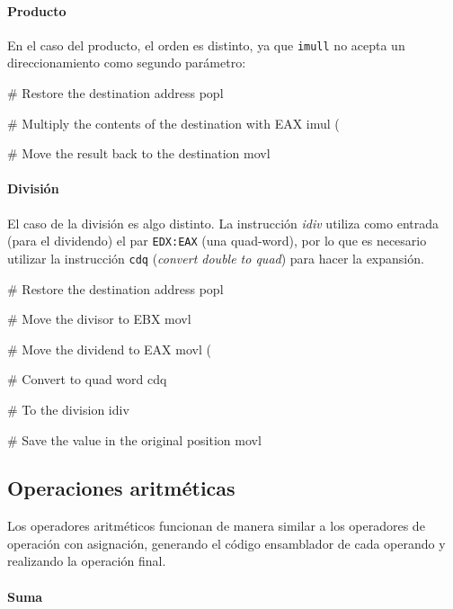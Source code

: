 \documentclass[11pt]{scrartcl}
\begin{document}
\paragraph{Producto}

En el caso del producto, el orden es distinto, ya que \texttt{imull} no acepta
un direccionamiento como segundo parámetro:

\begin{gascode}
   # Restore the destination address
   popl %

   # Multiply the contents of the destination with EAX
   imul (%

   # Move the result back to the destination
   movl %
\end{gascode}

\paragraph{División}

El caso de la división es algo distinto. La instrucción \textit{idiv} utiliza
como entrada (para el dividendo) el par \texttt{EDX:EAX} (una quad-word), por lo
que es necesario utilizar la instrucción \texttt{cdq} (\textit{convert double to
  quad}) para hacer la expansión.

\begin{gascode}
   # Restore the destination address
   popl %

   # Move the divisor to EBX
   movl %

   # Move the dividend to EAX
   movl (%

   # Convert to quad word
   cdq

   # To the division
   idiv %

   # Save the value in the original position
   movl %
  
\end{gascode}

\subsection{Operaciones aritméticas}

Los operadores aritméticos funcionan de manera similar a los operadores de
operación con asignación, generando el código ensamblador de cada operando y
realizando la operación final.

\paragraph{Suma}
\end{document}
